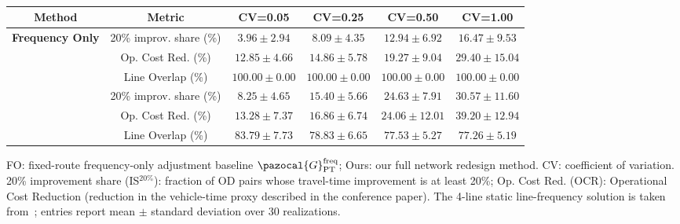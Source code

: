 \documentclass[a4paper,fleqn]{cas-sc}
\begin{document}
\begin{table}[pos=H]
\centering
\small
\setlength{\tabcolsep}{0pt}
\renewcommand{\arraystretch}{1.12}

\begin{threeparttable}
\begin{tabular*}{\textwidth}{@{\extracolsep{\fill}}cccccc@{}}
\toprule
\textbf{Method} & \textbf{Metric}
& \textbf{CV=0.05}
& \textbf{CV=0.25}
& \textbf{CV=0.50}
& \textbf{CV=1.00} \\
\midrule

\multirow{3}{*}{\textbf{Frequency Only}}
& 20\% improv. share (\%)
& $3.96\pm2.94$ & $8.09\pm4.35$
& $12.94\pm6.92$ & $16.47\pm9.53$ \\
& Op. Cost Red. (\%)
& $12.85\pm4.66$ & $14.86\pm5.78$
& $19.27\pm9.04$ & $29.40\pm15.04$ \\
& Line Overlap (\%)
& $100.00\pm0.00$ & $100.00\pm0.00$
& $100.00\pm0.00$ & $100.00\pm0.00$ \\
\addlinespace[0.25em]
\midrule

\multirow{3}{*}{\textbf{Ours}}
& 20\% improv. share (\%)
& $8.25\pm4.65$ & $15.40\pm5.66$
& $24.63\pm7.91$ & $30.57\pm11.60$ \\
& Op. Cost Red. (\%)
& $13.28\pm7.37$ & $16.86\pm6.74$
& $24.06\pm12.01$ & $39.20\pm12.94$ \\
& Line Overlap (\%)
& $83.79\pm7.73$ & $78.83\pm6.65$
& $77.53\pm5.27$ & $77.26\pm5.19$ \\

\bottomrule
\end{tabular*}

\begin{tablenotes}
\footnotesize
\item FO: fixed-route frequency-only adjustment baseline $\pazocal{G}_{\text{PT}}^{\text{freq}}$; Ours: our full network redesign method.
CV: coefficient of variation.
20\% improvement share (IS$^{20\%}$): fraction of OD pairs whose travel-time improvement is at least 20\%;
Op. Cost Red. (OCR): Operational Cost Reduction (reduction in the vehicle-time proxy described in the conference paper).
The 4-line static line-frequency solution is taken from~\citet{ahern2022approximate}; entries report mean $\pm$ standard deviation over 30 realizations.
\end{tablenotes}

\end{threeparttable}
\caption{}
\label{tab:frequencyBaselineCV}
\end{table}
\end{document}
